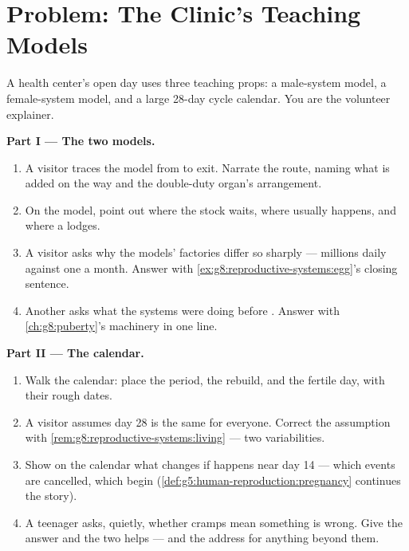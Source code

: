 \section{Problem: The Clinic's Teaching Models}

\begin{problem}\label{pb:g8:reproductive-systems:1}
A health center's open day uses three teaching props: a
male-system model, a female-system model, and a large
28-day cycle calendar. You are the volunteer explainer.

\medskip\noindent\textbf{Part I --- The two models.}
\begin{enumerate}
  \item A visitor traces the  model from  to
        exit. Narrate the route, naming what is added on
        the way and the double-duty organ's arrangement.
  \item On the  model, point out where the 
        stock waits, where  usually
        happens, and where a  lodges.
  \item A visitor asks why the models'  factories
        differ so sharply --- millions daily against one
        a month. Answer with
        \cref{ex:g8:reproductive-systems:egg}'s closing
        sentence.
  \item Another asks what the systems were doing before
        . Answer with \cref{ch:g8:puberty}'s
        machinery in one line.
\end{enumerate}

\medskip\noindent\textbf{Part II --- The calendar.}
\begin{enumerate}[resume]
  \item Walk the calendar: place the period, the
        rebuild,  and the fertile day, with
        their rough dates.
  \item A visitor assumes day 28 is the same for
        everyone. Correct the assumption with
        \cref{rem:g8:reproductive-systems:living} ---
        two variabilities.
  \item Show on the calendar what changes if
         happens near day 14 --- which
        events are cancelled, which begin
        (\cref{def:g5:human-reproduction:pregnancy}
        continues the story).
  \item A teenager asks, quietly, whether cramps mean
        something is wrong. Give the  answer and
        the two helps --- and the address for anything
        beyond them.
\end{enumerate}


\end{problem}
